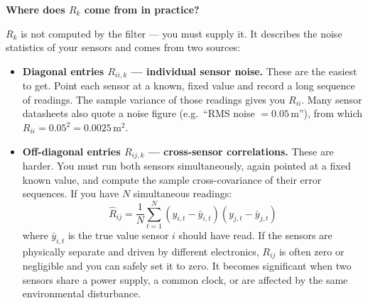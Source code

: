 \documentclass[12pt, a4paper]{article}
\begin{document}
\begin{notebox}
  \textbf{Where does $R_k$ come from in practice?}

  $R_k$ is not computed by the filter --- you must supply it.
  It describes the noise statistics of your sensors and comes from two
  sources:

  \begin{itemize}[leftmargin=1.2em, itemsep=3pt]
    \item \textbf{Diagonal entries $R_{ii,k}$ --- individual sensor noise.}
      These are the easiest to get.
      Point each sensor at a known, fixed value and record a long sequence
      of readings.
      The sample variance of those readings gives you $R_{ii}$.
      Many sensor datasheets also quote a noise figure (e.g.\ ``RMS noise
      $= 0.05$\,m''), from which $R_{ii} = 0.05^2 = 0.0025$\,m$^2$.

    \item \textbf{Off-diagonal entries $R_{ij,k}$ --- cross-sensor
      correlations.}
      These are harder.
      You must run both sensors simultaneously, again pointed at a fixed
      known value, and compute the sample cross-covariance of their error
      sequences.
      If you have $N$ simultaneous readings:
      \[
        \hat{R}_{ij}
        = \frac{1}{N}\sum_{t=1}^{N}
          (y_{i,t} - \bar{y}_{i,t})(y_{j,t} - \bar{y}_{j,t})
      \]
      where $\bar{y}_{i,t}$ is the true value sensor $i$ should have read.
      If the sensors are physically separate and driven by different
      electronics, $R_{ij}$ is often zero or negligible and you can safely
      set it to zero.
      It becomes significant when two sensors share a power supply, a
      common clock, or are affected by the same environmental disturbance.
  \end{itemize}
\end{notebox}
\end{document}
